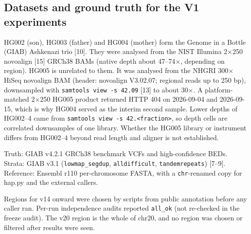\documentclass[11pt,a4paper]{article}
\makeatletter
\newcommand{\needspace}[1]{\par\ifdim\pagegoal=\maxdimen\else\dimen@=\pagegoal\advance\dimen@-\pagetotal\ifdim\dimen@<#1\relax\newpage\fi\fi}
\makeatother
\begin{document}
\needspace{6\baselineskip}
\subsection{\texorpdfstring{Datasets and ground truth for the V1 experiments}{Datasets and ground truth for the V1 experiments}}
HG002 (son), HG003 (father) and HG004 (mother) form the Genome in a Bottle (GIAB) Ashkenazi trio [10]. They were analysed from the NIST Illumina 2$\times$250 novoalign [15] GRCh38 BAMs (native depth about 47--74$\times$, depending on region). HG005 is unrelated to them. It was analysed from the NHGRI 300$\times$ HiSeq novoalign BAM (header: novoalign V3.02.07; regional reads up to 250 bp), downsampled with \texttt{samtools view -s 42.\allowbreak{}09} [13] to about 30$\times$. A platform-matched 2$\times$250 HG005 product returned HTTP 404 on 2026-09-04 and 2026-09-15, which is why HG004 served as the interim second sample. Lower depths of HG002--4 came from \texttt{samtools view -s 42.\allowbreak{}<fraction>}, so depth cells are correlated downsamples of one library. Whether the HG005 library or instrument differs from HG002--4 beyond read length and aligner is not established.

Truth: GIAB v4.2.1 GRCh38 benchmark VCFs and high-confidence BEDs. Strata: GIAB v3.1 (\texttt{lowmap\_\allowbreak{}segdup}, \texttt{alldifficult}, \texttt{tandemrepeats}) [7--9]. Reference: Ensembl r110 per-chromosome FASTA, with a \texttt{chr}-renamed copy for hap.py and the external callers.

Regions for v14 onward were chosen by scripts from public annotation before any caller ran. Per-run independence audits reported \texttt{all\_\allowbreak{}ok} (not re-checked in the freeze audit). The v20 region is the whole of chr20, and no region was chosen or filtered after results were seen.
\end{document}
